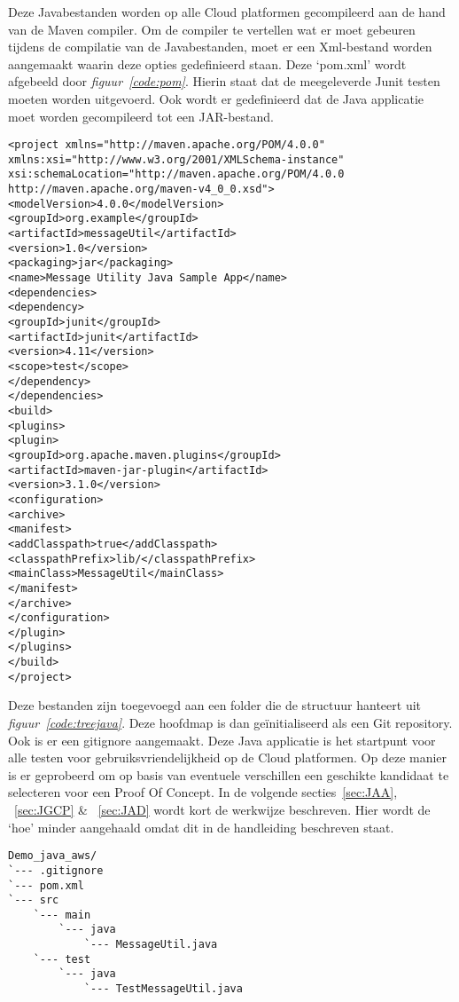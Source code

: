 Deze Javabestanden worden op alle Cloud platformen gecompileerd aan de hand van de Maven compiler. Om de compiler te vertellen wat er moet gebeuren tijdens de compilatie van de Javabestanden, moet er een Xml-bestand worden aangemaakt waarin deze opties gedefinieerd staan. Deze ‘pom.xml’ wordt afgebeeld door \emph{figuur~\ref{code:pom}}. Hierin staat dat de meegeleverde Junit testen moeten worden uitgevoerd. Ook wordt er gedefinieerd dat de Java applicatie moet worden gecompileerd tot een JAR-bestand.

\begin{lstlisting}
<project xmlns="http://maven.apache.org/POM/4.0.0" 
xmlns:xsi="http://www.w3.org/2001/XMLSchema-instance"
xsi:schemaLocation="http://maven.apache.org/POM/4.0.0 http://maven.apache.org/maven-v4_0_0.xsd">
<modelVersion>4.0.0</modelVersion>
<groupId>org.example</groupId>
<artifactId>messageUtil</artifactId>
<version>1.0</version>
<packaging>jar</packaging>
<name>Message Utility Java Sample App</name>
<dependencies>
<dependency>
<groupId>junit</groupId>
<artifactId>junit</artifactId>
<version>4.11</version>
<scope>test</scope>
</dependency>	
</dependencies>
<build>
<plugins>
<plugin>
<groupId>org.apache.maven.plugins</groupId>
<artifactId>maven-jar-plugin</artifactId>
<version>3.1.0</version>
<configuration>
<archive>
<manifest>
<addClasspath>true</addClasspath>
<classpathPrefix>lib/</classpathPrefix>
<mainClass>MessageUtil</mainClass>
</manifest>
</archive>
</configuration>
</plugin>
</plugins>
</build>
</project>
\end{lstlisting}

Deze bestanden zijn toegevoegd aan een folder die de structuur hanteert uit \emph{figuur~\ref{code:treejava}}. Deze hoofdmap is dan geïnitialiseerd als een Git repository. Ook is er een gitignore aangemaakt. Deze Java applicatie is het startpunt voor alle testen voor gebruiksvriendelijkheid op de Cloud platformen. Op deze manier is er geprobeerd om op basis van eventuele verschillen een geschikte kandidaat te selecteren voor een Proof Of Concept. In de volgende secties~\ref{sec:JAA}, ~\ref{sec:JGCP} \& ~\ref{sec:JAD} wordt kort de werkwijze beschreven. Hier wordt de ‘hoe’ minder aangehaald omdat dit in de handleiding beschreven staat.

\begin{lstlisting}
Demo_java_aws/
`--- .gitignore
`--- pom.xml
`--- src
    `--- main
        `--- java
            `--- MessageUtil.java
    `--- test
        `--- java
            `--- TestMessageUtil.java
\end{lstlisting}

